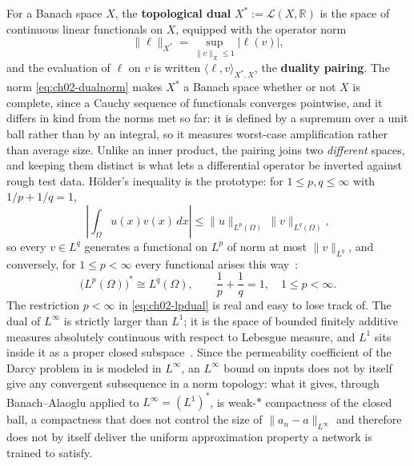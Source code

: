 For a Banach space $X$, the \textbf{topological dual} $X^* := \mathcal{L}(X, \mathbb{R})$ is the space of continuous linear functionals on $X$, equipped with the operator norm
\begin{equation}
  \|\ell\|_{X^*} = \sup_{\|v\|_X \le 1} |\ell(v)|,
  \label{eq:ch02-dualnorm}
\end{equation}
and the evaluation of $\ell$ on $v$ is written $\langle \ell, v \rangle_{X^*, X}$, the \textbf{duality pairing}. The norm \eqref{eq:ch02-dualnorm} makes $X^*$ a Banach space whether or not $X$ is complete, since a Cauchy sequence of functionals converges pointwise, and it differs in kind from the norms met so far: it is defined by a supremum over a unit ball rather than by an integral, so it measures worst-case amplification rather than average size. Unlike an inner product, the pairing joins two \emph{different} spaces, and keeping them distinct is what lets a differential operator be inverted against rough test data. H\"older's inequality is the prototype: for $1 \le p, q \le \infty$ with $1/p + 1/q = 1$,
\begin{equation}
  \left| \int_\Omega u(x) v(x) \, dx \right| \le \|u\|_{L^p(\Omega)} \, \|v\|_{L^q(\Omega)},
  \label{eq:ch02-holder}
\end{equation}
so every $v \in L^q$ generates a functional on $L^p$ of norm at most $\|v\|_{L^q}$, and conversely, for $1 \le p < \infty$ every functional arises this way~\cite{brezis2011functional}:
\begin{equation}
  \big(L^p(\Omega)\big)^* \cong L^q(\Omega), \qquad \frac{1}{p} + \frac{1}{q} = 1, \quad 1 \le p < \infty .
  \label{eq:ch02-lpdual}
\end{equation}
The restriction $p < \infty$ in \eqref{eq:ch02-lpdual} is real and easy to lose track of. The dual of $L^\infty$ is strictly larger than $L^1$; it is the space of bounded finitely additive measures absolutely continuous with respect to Lebesgue measure, and $L^1$ sits inside it as a proper closed subspace~\cite{brezis2011functional}. Since the permeability coefficient of the Darcy problem in  is modeled in $L^\infty$, an $L^\infty$ bound on inputs does not by itself give any convergent subsequence in a norm topology: what it gives, through Banach--Alaoglu applied to $L^\infty = (L^1)^*$, is weak-$*$ compactness of the closed ball, a compactness that does not control the size of $\|a_n - a\|_{L^\infty}$ and therefore does not by itself deliver the uniform approximation property a network is trained to satisfy.

